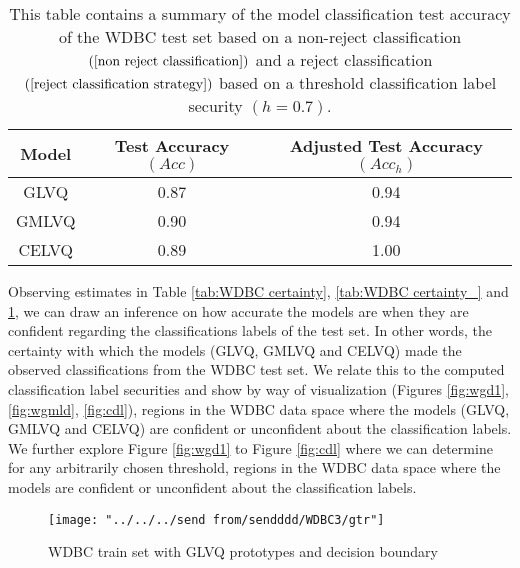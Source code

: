 \begin{table}[H]
	\centering
	\begin{tabular}{ |c|c|c|  }
		\hline
		Model & Test Accuracy $(Acc)$   & Adjusted Test Accuracy $(Acc_{h})$   \\
		\hline
		GLVQ &0.87   &0.94   \\
		GMLVQ &0.90  &0.94   \\
		CELVQ &0.89  &1.00   \\		
		\hline
	\end{tabular}
	\caption[Summary of model classification test accuracy of the WDBC test set]{\label{tab:WDC summary3}This table contains a summary of the model classification test accuracy of the WDBC test set based on a non-reject classification\hspace{2pt}$(\ref{non reject classification})$\hspace{2pt} and a reject classification\hspace{2pt} $(\ref{reject classification strategy})$\hspace{2pt} based on a threshold classification label security\hspace{2pt} $(h=0.7)$.\hspace{2pt}}
\end{table}
Observing estimates in Table \ref{tab:WDBC certainty}, \ref{tab:WDBC certainty_} and \ref{tab:WDC summary3}, we can draw an inference on how accurate the models are when they are confident regarding the classifications labels of the test set. In other words, the certainty with which the models (GLVQ, GMLVQ and CELVQ) made the observed classifications from the WDBC test set. We relate this to the computed classification label securities and show by way of visualization (Figures \ref{fig:wgd1}, \ref{fig:wgmld}, \ref{fig:cdl}), regions in the WDBC data space where the models (GLVQ, GMLVQ and CELVQ) are confident or unconfident about the classification labels. We further explore Figure \ref{fig:wgd1} to Figure \ref{fig:cdl} where we can determine for any arbitrarily chosen threshold, regions in the WDBC data space where the models are confident or unconfident about the classification labels.

\begin{figure}[H]
	\centering
	\texttt{[image: "../../../send from/sendddd/WDBC3/gtr"]}
	\caption[WDBC train set with GLVQ prototypes]{WDBC train set with GLVQ prototypes and decision boundary}
	\label{fig:wg1}
\end{figure}


